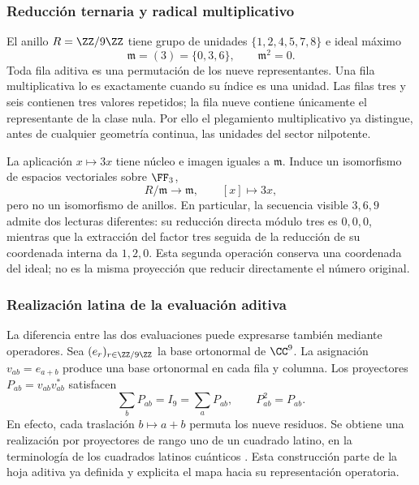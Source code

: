 

\subsubsection{Reducción ternaria y radical multiplicativo}

El anillo \(R=\ZZ/9\ZZ\) tiene grupo de unidades \(\{1,2,4,5,7,8\}\) e ideal máximo
\[
 \mathfrak m=(3)=\{0,3,6\},\qquad\mathfrak m^2=0.
\]
Toda fila aditiva es una permutación de los nueve representantes. Una fila multiplicativa lo es exactamente cuando su índice es una unidad. Las filas tres y seis contienen tres valores repetidos; la fila nueve contiene únicamente el representante de la clase nula. Por ello el plegamiento multiplicativo ya distingue, antes de cualquier geometría continua, las unidades del sector nilpotente.

La aplicación \(x\mapsto3x\) tiene núcleo e imagen iguales a \(\mathfrak m\). Induce un isomorfismo de espacios vectoriales sobre \(\FF_3\),
\[
 R/\mathfrak m\longrightarrow\mathfrak m,\qquad [x]\longmapsto3x,
\]
pero no un isomorfismo de anillos. En particular, la secuencia visible \(3,6,9\) admite dos lecturas diferentes: su reducción directa módulo tres es \(0,0,0\), mientras que la extracción del factor tres seguida de la reducción de su coordenada interna da \(1,2,0\). Esta segunda operación conserva una coordenada del ideal; no es la misma proyección que reducir directamente el número original.

\subsubsection{Realización latina de la evaluación aditiva}

La diferencia entre las dos evaluaciones puede expresarse también mediante
operadores. Sea \((e_r)_{r\in\ZZ/9\ZZ}\) la base ortonormal de \(\CC^9\).
La asignación \(v_{ab}=e_{a+b}\) produce una base ortonormal en cada fila
y columna. Los proyectores \(P_{ab}=v_{ab}v_{ab}^{*}\) satisfacen
\[
 \sum_bP_{ab}=I_9=\sum_aP_{ab},\qquad P_{ab}^2=P_{ab}.
\]
En efecto, cada traslación \(b\mapsto a+b\) permuta los nueve residuos.
Se obtiene una realización por proyectores de rango uno de un cuadrado
latino, en la terminología de los cuadrados latinos cuánticos
\cite{mustovicary,delascuevas2023}. Esta construcción parte de la hoja
aditiva ya definida y explicita el mapa hacia su representación operatoria.

